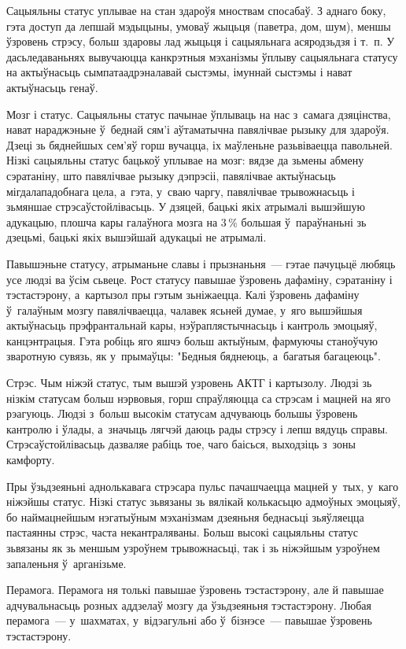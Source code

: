 Сацыяльны статус уплывае на стан здароўя мноствам спосабаў. З аднаго боку, гэта доступ да лепшай мэдыцыны, умоваў жыцьця (паветра, дом, шум), меншы ўзровень стрэсу, больш здаровы лад жыцьця і сацыяльнага асяродзьдзя і т.~п. У дасьледаваньнях вывучаюцца канкрэтныя мэханізмы ўплыву сацыяльнага статусу на актыўнасьць сымпатаадрэналавай сыстэмы, імуннай сыстэмы і нават актыўнасьць генаў.

Мозг і статус. Сацыяльны статус пачынае ўплываць на нас з~самага дзяцінства, нават нараджэньне ў~беднай сям'і аўтаматычна павялічвае рызыку для здароўя. Дзеці зь бяднейшых сем'яў горш вучацца, іх маўленьне разьвіваецца павольней. Нізкі сацыяльны статус бацькоў уплывае на мозг: вядзе да зьмены абмену сэратаніну, што павялічвае рызыку дэпрэсіі, павялічвае актыўнасьць мігдалападобнага цела, а~гэта, у~сваю чаргу, павялічвае трывожнасьць і зьмяншае стрэсаўстойлівасьць. У дзяцей, бацькі якіх атрымалі вышэйшую адукацыю, плошча кары галаўнога мозга на 3\,\% большая ў~параўнаньні зь дзецьмі, бацькі якіх вышэйшай адукацыі не атрымалі.

Павышэньне статусу, атрыманьне славы і прызнаньня~--- гэтае пачуцьцё любяць усе людзі ва ўсім сьвеце. Рост статусу павышае ўзровень дафаміну, сэратаніну і тэстастэрону, а~картызол пры гэтым зьніжаецца. Калі ўзровень дафаміну ў~галаўным мозгу павялічваецца, чалавек ясьней думае, у~яго вышэйшыя актыўнасьць прэфрантальнай кары, нэўраплястычнасьць і кантроль эмоцыяў, канцэнтрацыя. Гэта робіць яго яшчэ больш актыўным, фармуючы станоўчую зваротную сувязь, як у~прымаўцы: "Бедныя бяднеюць, а~багатыя багацеюць".

Стрэс. Чым ніжэй статус, тым вышэй узровень АКТГ і картызолу. Людзі зь нізкім статусам больш нэрвовыя, горш спраўляюцца са стрэсам і мацней на яго рэагуюць. Людзі з~больш высокім статусам адчуваюць большы ўзровень кантролю і ўлады, а~значыць лягчэй даюць рады стрэсу і лепш вядуць справы. Стрэсаўстойлівасьць дазваляе рабіць тое, чаго баісься, выходзіць з~зоны камфорту.

Пры ўзьдзеяньні аднолькавага стрэсара пульс пачашчаецца мацней у~тых, у~каго ніжэйшы статус. Нізкі статус зьвязаны зь вялікай колькасьцю адмоўных эмоцыяў, бо наймацнейшым нэгатыўным мэханізмам дзеяньня беднасьці зьяўляецца пастаянны стрэс, часта некантраляваны. Больш высокі сацыяльны статус зьвязаны як зь меншым узроўнем трывожнасьці, так і зь ніжэйшым узроўнем запаленьня ў~арганізьме.

Перамога. Перамога ня толькі павышае ўзровень тэстастэрону, але й павышае адчувальнасьць розных аддзелаў мозгу да ўзьдзеяньня тэстастэрону. Любая перамога~--- у~шахматах, у~відэагульні або ў~бізнэсе~--- павышае ўзровень тэстастэрону. 

